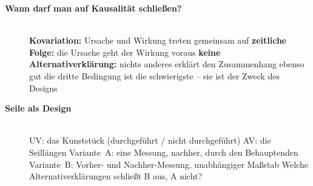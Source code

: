 \begin{description}
\item[{\rot\bf Wann darf man auf Kausalität schließen?}]~\\[-\lblskip]
\bi
  \ite \textbf{Kovariation:} Ursache und Wirkung treten gemeinsam auf
  \ite \textbf{zeitliche Folge:} die Ursache geht der Wirkung voraus
  \ite \textbf{keine Alternativerklärung:} nichts anderes erklärt den
    Zusammenhang ebenso gut
  \ite die dritte Bedingung ist die schwierigste -- sie ist der Zweck des
    Designs
\ei
\os{\newpage}

\item[{\rot\bf Seile als Design}]~\\[-\lblskip]
\bi
  \ite UV: das Kunststück (durchgeführt / nicht durchgeführt)
  \ite AV: die Seillängen
  \ite Variante~A: eine Messung, nachher, durch den Behauptenden
  \ite Variante~B: Vorher- und Nachher-Messung, unabhängiger Maßstab
  \ite Welche Alternativerklärungen schließt B aus, A nicht?
\ei
\os{\newpage}
\end{description}

